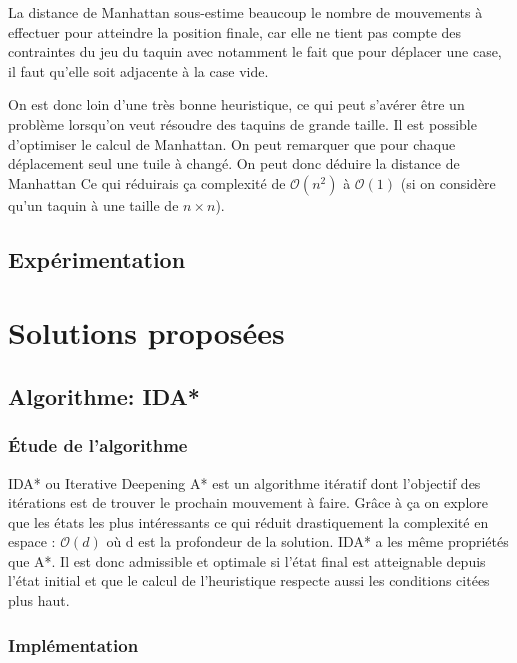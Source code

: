 \documentclass[a4paper, 12pt]{article}
\begin{document}
La distance de Manhattan sous-estime beaucoup le nombre de mouvements à effectuer pour atteindre la position finale, car elle ne tient pas compte des contraintes du jeu du taquin avec notamment le fait que pour déplacer une case, il faut qu'elle soit adjacente à la case vide.

On est donc loin d'une très bonne heuristique, ce qui peut s'avérer être un problème lorsqu'on veut résoudre des taquins de grande taille.
Il est possible d'optimiser le calcul de Manhattan. On peut remarquer que pour chaque déplacement seul une tuile à changé. On peut donc déduire la distance de Manhattan Ce qui réduirais ça complexité de $\mathcal{O}(n^{2})$ à $\mathcal{O}(1)$ (si on considère qu'un taquin à une taille de $n \times n$).

\subsection{Expérimentation}

\section{Solutions proposées}

\subsection{Algorithme: IDA*}

\subsubsection{Étude de l'algorithme}

IDA* ou Iterative Deepening A* est un algorithme itératif dont l'objectif des itérations est de trouver le prochain mouvement à faire.
Grâce à ça on explore que les états les plus intéressants ce qui réduit drastiquement la complexité en espace : $\mathcal{O}(d)$ où d est la profondeur de la solution.
IDA* a les même propriétés que A*. Il est donc admissible et optimale si l'état final est atteignable depuis l'état initial et que le calcul de l'heuristique respecte aussi les conditions citées plus haut.

\subsubsection{Implémentation}
\end{document}

